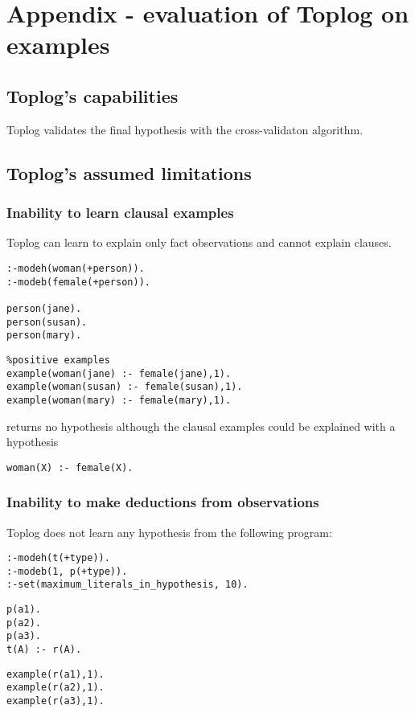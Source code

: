 \chapter{Appendix - evaluation of Toplog on examples}

\section{Toplog's capabilities}
Toplog validates the final hypothesis with the cross-validaton algorithm.

\section{Toplog's assumed limitations}

\subsection{Inability to learn clausal examples}\label{toplog_clausal_examples}
Toplog can learn to explain only fact observations and cannot explain clauses.

\begin{minipage}[t]{.38\textwidth}
\begin{lstlisting}
:-modeh(woman(+person)).
:-modeb(female(+person)).

person(jane).
person(susan).
person(mary).
\end{lstlisting}
\end{minipage}
\begin{minipage}[t]{.20\textwidth}
\begin{lstlisting}
%positive examples
example(woman(jane) :- female(jane),1).
example(woman(susan) :- female(susan),1).
example(woman(mary) :- female(mary),1).
\end{lstlisting}
\end{minipage}

returns no hypothesis although the clausal examples could be explained with a hypothesis
\begin{lstlisting}
woman(X) :- female(X).
\end{lstlisting}

\subsection{Inability to make deductions from observations}
Toplog does not learn any hypothesis from the following program:

\begin{lstlisting}
:-modeh(t(+type)).
:-modeb(1, p(+type)).
:-set(maximum_literals_in_hypothesis, 10).
\end{lstlisting}
\begin{minipage}[t]{.40\textwidth}
\begin{lstlisting}
p(a1).
p(a2).
p(a3).
t(A) :- r(A).
\end{lstlisting}
\end{minipage}
\begin{minipage}[t]{.40\textwidth}
\begin{lstlisting}
example(r(a1),1).
example(r(a2),1).
example(r(a3),1).
\end{lstlisting}
\end{minipage}

